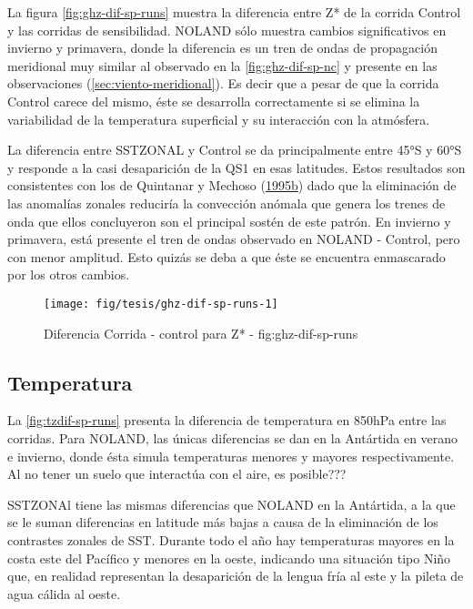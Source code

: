 \documentclass[spanish,a4paper]{book}
\begin{document}
La figura \autoref{fig:ghz-dif-sp-runs} muestra la diferencia entre Z*
de la corrida Control y las corridas de sensibilidad. NOLAND sólo
muestra cambios significativos en invierno y primavera, donde la
diferencia es un tren de ondas de propagación meridional muy similar al
observado en la \autoref{fig:ghz-dif-sp-nc} y presente en las
observaciones (\autoref{sec:viento-meridional}). Es decir que a pesar de
que la corrida Control carece del mismo, éste se desarrolla
correctamente si se elimina la variabilidad de la temperatura
superficial y su interacción con la atmósfera.

La diferencia entre SSTZONAL y Control se da principalmente entre 45°S y
60°S y responde a la casi desaparición de la QS1 en esas latitudes.
Estos resultados son consistentes con los de Quintanar y Mechoso
(\protect\hyperlink{ref-Quintanar1995}{1995}\protect\hyperlink{ref-Quintanar1995}{b})
dado que la eliminación de las anomalías zonales reduciría la convección
anómala que genera los trenes de onda que ellos concluyeron son el
principal sostén de este patrón. En invierno y primavera, está presente
el tren de ondas observado en NOLAND - Control, pero con menor amplitud.
Esto quizás se deba a que éste se encuentra enmascarado por los otros
cambios.

\begin{figure*}
\texttt{[image: fig/tesis/ghz-dif-sp-runs-1]} \caption{Diferencia Corrida - control para Z* - fig:ghz-dif-sp-runs}\label{fig:ghz-dif-sp-runs}
\end{figure*}

\subsection{Temperatura}\label{temperatura-2}

La \autoref{fig:tzdif-sp-runs} presenta la diferencia de temperatura en
850hPa entre las corridas. Para NOLAND, las únicas diferencias se dan en
la Antártida en verano e invierno, donde ésta simula temperaturas
menores y mayores respectivamente. Al no tener un suelo que interactúa
con el aire, es posible???

SSTZONAl tiene las mismas diferencias que NOLAND en la Antártida, a la
que se le suman diferencias en latitude más bajas a causa de la
eliminación de los contrastes zonales de SST. Durante todo el año hay
temperaturas mayores en la costa este del Pacífico y menores en la
oeste, indicando una situación tipo Niño que, en realidad representan la
desaparición de la lengua fría al este y la pileta de agua cálida al
oeste.
\end{document}
